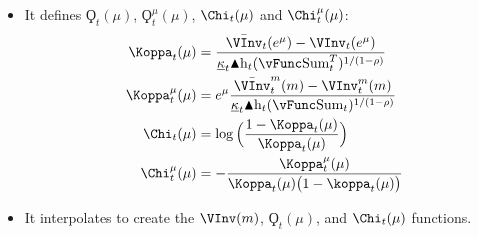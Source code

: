 \documentclass[titlepage,abstract]{\econtex}
\providecommand{\vSum}{\vFunc\text{Sum}}
\providecommand{\Deltah}{\blacktriangle \mathrm{h}}
\begin{document}
\begin{itemize}
        \item It defines $\ensuremath{\Koppa}_{t}(\mu)$, $\ensuremath{\Koppa}_{t}^{\mu}(\mu)$, $\Chi_{t}(\mu)$ and $\Chi_{t}^{\mu}(\mu)$:
            \begin{equation}\begin{gathered}\begin{aligned}
            \Koppa_{t} (\mu)  & =  \frac{\bar{\VInv}_{t} (e^{\mu}) -\VInv_{t} (e^{\mu})}{\underline{\kappa}_{t} \Deltah_{t} (\vSum_{t}^{T})^{1/(1-\rho)}} \\
            \Koppa_{t}^{\mu} (\mu)  & =  e^{\mu} \frac{\bar{\VInv}_{t}^{m} (m)- \VInv_{t}^{m} (m)}{\underline{\kappa}_{t} \Deltah_{t} (\vSum_{t})^{1/(1-\rho)}} \\
            \Chi_{t} (\mu)  & =  \log\Big(\frac{1-\Koppa_{t} (\mu)}{\Koppa_{t} (\mu) }\Big) \\
            \Chi_{t}^{\mu} (\mu)  & =  -\frac{\Koppa_{t}^{\mu}(\mu)}{\Koppa_{t} (\mu)\big(1-\koppa_{t} (\mu)\big)}
            \end{aligned}\end{gathered}\end{equation}
        \item It interpolates to create the $\VInv(m)$, $\ensuremath{\Koppa}_{t}(\mu)$, and $\Chi_{t}(\mu)$ functions.
        \end{itemize}
\end{document}
